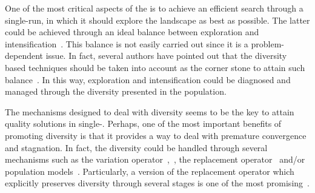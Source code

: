 One of the most critical aspects of the \EAS{} is to achieve an efficient search through a single-run, in which it should explore the landscape as best as possible.
%
The latter could be achieved through an ideal balance between exploration and intensification~\cite{lin2009auto}.
%
This balance is not easily carried out since it is a problem-dependent issue.
%
In fact, several authors have pointed out that the diversity based techniques should be taken into account as the corner stone to attain such balance~\cite{vcrepinvsek2013exploration}.
%
In this way, exploration and intensification could be diagnosed and managed through the diversity presented in the population.
%


The mechanisms designed to deal with diversity seems to be the key to attain quality solutions in single-\EAS{}.
%
Perhaps, one of the most important benefits of promoting diversity is that it provides a way to deal with premature convergence and stagnation.
%
In fact, the diversity could be handled through several mechanisms such as the variation operator~\cite{herrera2003fuzzy},~\cite{mitchell1998introduction}, the replacement operator~\cite{segura2015novel} and/or population models~\cite{koumousis2006saw}.
%
Particularly, a version of the replacement operator which explicitly preserves diversity through several stages is one of the most promising~\cite{vcrepinvsek2013exploration}.
%

